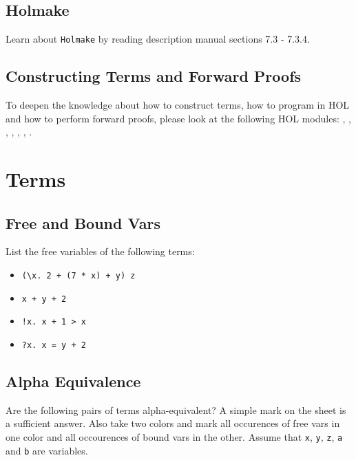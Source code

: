 \documentclass[a4paper,10pt,oneside]{scrartcl}
\begin{document}
\subsection{Holmake}
Learn about \texttt{Holmake} by reading description manual sections 7.3 - 7.3.4.  

\subsection{Constructing Terms and Forward Proofs}

To deepen the knowledge about how to construct terms, how to program in HOL and how to perform 
forward proofs, please look at the following HOL modules: , ,
, , , , .


\section{Terms}

\subsection{Free and Bound Vars}

List the free variables of the following terms:
\begin{itemize}
\item \verb#(\x. 2 + (7 * x) + y) z#
\item \verb#x + y + 2#
\item \verb#!x. x + 1 > x#
\item \verb#?x. x = y + 2#
\end{itemize}

\subsection{Alpha Equivalence}

Are the following pairs of terms alpha-equivalent? A simple mark on the sheet is a sufficient answer. Also take two colors and mark all occurences of free vars in one color and all occourences of bound vars in the other. Assume that \texttt{x}, \texttt{y}, \texttt{z}, \texttt{a} and \texttt{b} are variables. \bigskip
\end{document}
